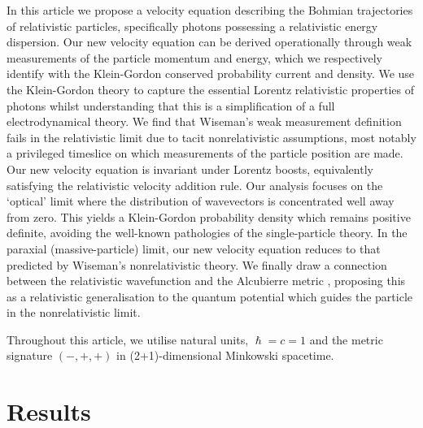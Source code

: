 \documentclass[12pt,prx,
,nofootinbib
,floatfix
,superscriptaddress
]{revtex4-2}
\begin{document}
In this article we propose a velocity equation describing the Bohmian trajectories of relativistic particles, specifically photons possessing a relativistic energy dispersion. Our new velocity equation can be derived operationally through weak measurements of the particle momentum and energy, which we respectively identify with the Klein-Gordon conserved probability current and density.  We use the Klein-Gordon theory to capture the essential Lorentz relativistic properties of photons whilst understanding that this is a simplification of a full electrodynamical theory. We find that Wiseman's weak measurement definition fails in the relativistic limit due to tacit nonrelativistic assumptions, most notably a privileged timeslice on which measurements of the particle position are made. Our new velocity equation is invariant under Lorentz boosts, equivalently satisfying the relativistic velocity addition rule. Our analysis focuses on the `optical' limit where the distribution of wavevectors is concentrated well away from zero.  This yields a Klein-Gordon probability density which remains positive definite, avoiding the well-known pathologies of the single-particle theory. In the paraxial (massive-particle) limit, our new velocity equation reduces to that predicted by Wiseman's nonrelativistic theory. We finally draw a connection between the relativistic wavefunction and the Alcubierre metric \cite{Alcubierre_1994}, proposing this as a relativistic generalisation to the quantum potential \cite{bohmPhysRev.85.166} which guides the particle in the nonrelativistic limit.

Throughout this article, we utilise natural units, $\hslash = c = 1$ and the metric signature $(-,+,+)$ in (2+1)-dimensional Minkowski spacetime. 


\section{Results}
\end{document}
